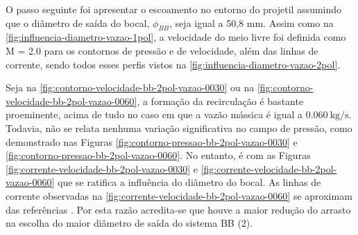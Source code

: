 O passo seguinte foi apresentar o escoamento no entorno do projetil assumindo que o diâmetro de saída do bocal, \(\phi_{BB}\), seja igual a 50,8 mm. Assim como na \autoref{fig:influencia-diametro-vazao-1pol}, a velocidade do meio livre foi definida como M = \num{2,0} para os contornos de pressão e de velocidade, além das linhas de corrente, sendo todos esses perfis vistos na \autoref{fig:influencia-diametro-vazao-2pol}.

Seja na \autoref{fig:contorno-velocidade-bb-2pol-vazao-0030} ou na \autoref{fig:contorno-velocidade-bb-2pol-vazao-0060}, a formação da recirculação é bastante proeminente, acima de tudo no caso em que a vazão mássica é igual a \(\qty{0,060}{\kilogram\per\second}\). Todavia, não se relata nenhuma variação significativa no campo de pressão, como demonstrado nas Figuras \ref{fig:contorno-pressao-bb-2pol-vazao-0030} e \ref{fig:contorno-pressao-bb-2pol-vazao-0060}. No entanto, é com as Figuras \ref{fig:corrente-velocidade-bb-2pol-vazao-0030} e \ref{fig:corrente-velocidade-bb-2pol-vazao-0060} que se ratifica a influência do diâmetro do bocal. As linhas de corrente observadas na \autoref{fig:corrente-velocidade-bb-2pol-vazao-0060} se aproximam das referências \cite{Sahu1985,Mahmoud2009,Lucena2020}. Por esta razão acredita-se que houve a maior redução do arrasto na escolha do maior diâmetro de saída do sistema BB (\qty{2}{\polegada}).

